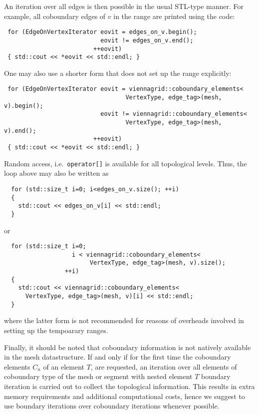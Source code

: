 An iteration over all edges is then possible in the usual STL-type manner. For example, all coboundary edges of $v$ in the range are printed using the code:
\begin{lstlisting}
 for (EdgeOnVertexIterator eovit = edges_on_v.begin();
                           eovit != edges_on_v.end();
                         ++eovit)
 { std::cout << *eovit << std::endl; }
\end{lstlisting}
One may also use a shorter form that does not set up the range explicitly:
\begin{lstlisting}
 for (EdgeOnVertexIterator eovit = viennagrid::coboundary_elements<
                                  VertexType, edge_tag>(mesh, v).begin();
                           eovit != viennagrid::coboundary_elements<
                                  VertexType, edge_tag>(mesh, v).end();
                         ++eovit)
 { std::cout << *eovit << std::endl; }
\end{lstlisting}

Random access, i.e.~\lstinline|operator[]| is available for all topological levels. Thus, the loop above may also be written as
\begin{lstlisting}
  for (std::size_t i=0; i<edges_on_v.size(); ++i)
  {
    std::cout << edges_on_v[i] << std::endl;
  }
\end{lstlisting}
or
\begin{lstlisting}
  for (std::size_t i=0;
                   i < viennagrid::coboundary_elements<
                        VertexType, edge_tag>(mesh, v).size();
                 ++i)
  {
    std::cout << viennagrid::coboundary_elements<
      VertexType, edge_tag>(mesh, v)[i] << std::endl;
  }
\end{lstlisting}
where the latter form is not recommended for reasons of overheads involved in setting up the tempoarary ranges.

Finally, it should be noted that coboundary information is not natively available in the mesh datastructure. If and only if for the first time
the coboundary elements $C_n$ of an element $T$, are requested, an iteration over all elements of coboundary type of the mesh or segment with nested element $T$ boundary iteration is carried out to collect the topological information.
This results in extra memory requirements and additional computational costs, hence we suggest to use boundary iterations over coboundary iterations whenever possible.



